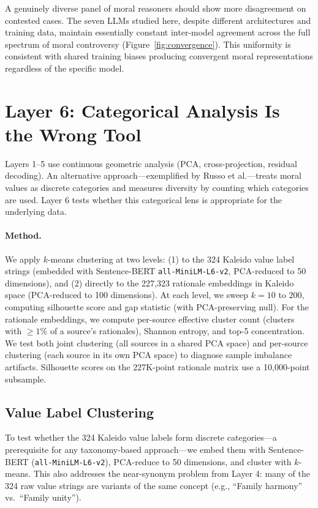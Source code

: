 \documentclass[11pt,a4paper]{article}
\begin{document}
A genuinely diverse panel of moral reasoners should show more disagreement on contested cases. The seven LLMs studied here, despite different architectures and training data, maintain essentially constant inter-model agreement across the full spectrum of moral controversy (Figure~\ref{fig:convergence}). This uniformity is consistent with shared training biases producing convergent moral representations regardless of the specific model.

\section{Layer 6: Categorical Analysis Is the Wrong Tool}

Layers 1--5 use continuous geometric analysis (PCA, cross-projection, residual decoding). An alternative approach---exemplified by Russo et al.---treats moral values as discrete categories and measures diversity by counting which categories are used. Layer 6 tests whether this categorical lens is appropriate for the underlying data.

\paragraph{Method.} We apply $k$-means clustering at two levels: (1) to the 324 Kaleido value label strings (embedded with Sentence-BERT \texttt{all-MiniLM-L6-v2}, PCA-reduced to 50 dimensions), and (2) directly to the 227,323 rationale embeddings in Kaleido space (PCA-reduced to 100 dimensions). At each level, we sweep $k = 10$ to $200$, computing silhouette score and gap statistic (with PCA-preserving null). For the rationale embeddings, we compute per-source effective cluster count (clusters with $\geq 1$\% of a source's rationales), Shannon entropy, and top-5 concentration. We test both joint clustering (all sources in a shared PCA space) and per-source clustering (each source in its own PCA space) to diagnose sample imbalance artifacts. Silhouette scores on the 227K-point rationale matrix use a 10,000-point subsample.

\subsection{Value Label Clustering}

To test whether the 324 Kaleido value labels form discrete categories---a prerequisite for any taxonomy-based approach---we embed them with Sentence-BERT (\texttt{all-MiniLM-L6-v2}), PCA-reduce to 50 dimensions, and cluster with $k$-means. This also addresses the near-synonym problem from Layer 4: many of the 324 raw value strings are variants of the same concept (e.g., ``Family harmony'' vs.\ ``Family unity'').
\end{document}
